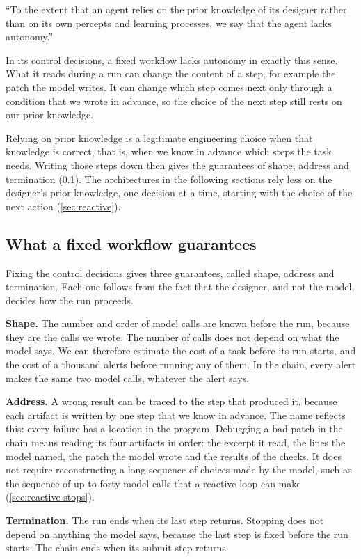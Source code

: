 \begin{definition}[Autonomy]
\label{def:fixed-autonomy}
``To the extent that an agent relies on the prior knowledge of its designer rather than on its own
percepts and learning processes, we say that the agent lacks autonomy.''
\citep[\S2.2.3]{russell2020aima}
\end{definition}

In its control decisions, a fixed workflow lacks autonomy in exactly this sense. What it reads
during a run can change the content of a step, for example the patch the model writes. It can
change which step comes next only through a condition that we wrote in advance, so the choice of
the next step still rests on our prior knowledge.

Relying on prior knowledge is a legitimate engineering choice when that knowledge is correct, that
is, when we know in advance which steps the task needs. Writing those steps down then gives the
guarantees of shape, address and termination (\cref{sec:fixed-guarantees}). The architectures in
the following sections rely less on the designer's prior knowledge, one decision at a time,
starting with the choice of the next action (\cref{sec:reactive}).

\subsection{What a fixed workflow guarantees}
\label{sec:fixed-guarantees}

Fixing the control decisions gives three guarantees, called shape, address and termination. Each
one follows from the fact that the designer, and not the model, decides how the run proceeds.
\bi
\item \textbf{Shape.} The number and order of model calls are known before the run, because they
are the calls we wrote. The number of calls does not depend on what the model says. We can
therefore estimate the cost of a task before its run starts, and the cost of a thousand alerts
before running any of them. In the chain, every alert makes the same two model calls, whatever the
alert says.
\item \textbf{Address.} A wrong result can be traced to the step that produced it, because each
artifact is written by one step that we know in advance. The name reflects this: every failure has
a location in the program. Debugging a bad patch in the chain means reading its four artifacts in
order: the excerpt it read, the lines the model named, the patch the model wrote and the results of
the checks. It does not require reconstructing a long sequence of choices made by the model, such
as the sequence of up to forty model calls that a reactive loop can make (\cref{sec:reactive-stops}).
\item \textbf{Termination.} The run ends when its last step returns. Stopping does not depend on
anything the model says, because the last step is fixed before the run starts. The chain ends when
its submit step returns.
\ei

